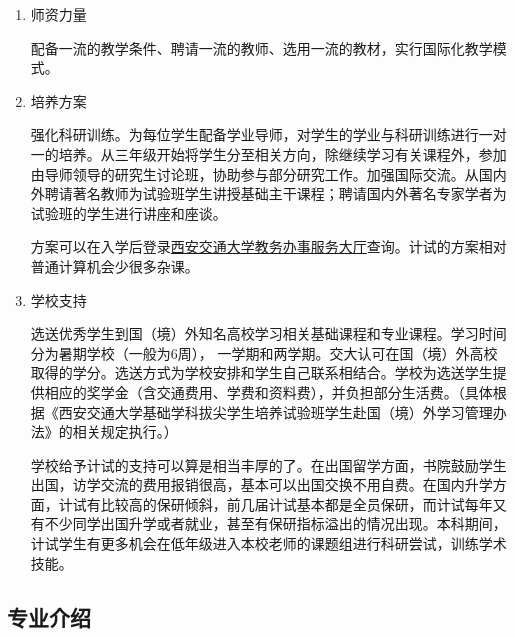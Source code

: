 \documentclass[zihao=-4,fontset=none]{Beautybook-CN}
\begin{document}
\begin{enumerate}
	\item 师资力量
	      	          
	      配备一流的教学条件、聘请一流的教师、选用一流的教材，实行国际化教学模式。
	      	          
	\item 培养方案
	      	          
	      强化科研训练。为每位学生配备学业导师，对学生的学业与科研训练进行一对一的培养。从三年级开始将学生分至相关方向，除继续学习有关课程外，参加由导师领导的研究生讨论班，协助参与部分研究工作。加强国际交流。从国内外聘请著名教师为试验班学生讲授基础主干课程；聘请国内外著名专家学者为试验班的学生进行讲座和座谈。
	      	          
	      方案可以在入学后登录\href{http://ehall.xjtu.edu.cn}{西安交通大学教务办事服务大厅}查询。计试的方案相对普通计算机会少很多杂课。
	      	          
	\item 学校支持
	      	          
	      选送优秀学生到国（境）外知名高校学习相关基础课程和专业课程。学习时间分为暑期学校（一般为6周）， 一学期和两学期。交大认可在国（境）外高校取得的学分。选送方式为学校安排和学生自己联系相结合。学校为选送学生提供相应的奖学金（含交通费用、学费和资料费），并负担部分生活费。（具体根据《西安交通大学基础学科拔尖学生培养试验班学生赴国（境）外学习管理办法》的相关规定执行。）
	      	          
	      学校给予计试的支持可以算是相当丰厚的了。在出国留学方面，书院鼓励学生出国，访学交流的费用报销很高，基本可以出国交换不用自费。在国内升学方面，计试有比较高的保研倾斜，前几届计试基本都是全员保研，而计试每年又有不少同学出国升学或者就业，甚至有保研指标溢出的情况出现。本科期间，计试学生有更多机会在低年级进入本校老师的课题组进行科研尝试，训练学术技能。
\end{enumerate}

\subsection{专业介绍}
\end{document}
